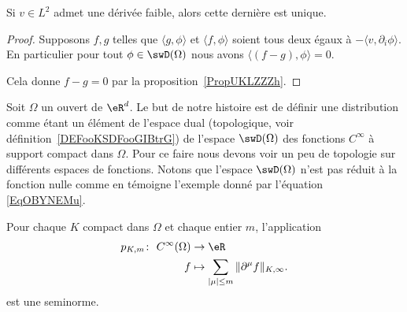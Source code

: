\begin{lemma}
	Si \( v\in L^2\) admet une dérivée faible, alors cette dernière est unique.
\end{lemma}

\begin{proof}
	Supposons \( f,g\) telles que \( \langle g, \phi\rangle \) et \( \langle f, \phi\rangle \) soient tous deux égaux à \( -\langle v, \partial_i\phi\rangle \). En particulier pour tout \( \phi\in  \swD(\Omega)\) nous avons \( \langle (f-g), \phi\rangle =0\).

	Cela donne \( f-g=0\) par la proposition~\ref{PropUKLZZZh}.
\end{proof}

Soit \( \Omega\) un ouvert de \( \eR^d\). Le but de notre histoire est de définir une distribution comme étant un élément de l'espace dual (topologique, voir définition~\ref{DEFooKSDFooGIBtrG}) de l'espace \( \swD(\Omega)\) des fonctions \( C^{\infty}\) à support compact dans \( \Omega\). Pour ce faire nous devons voir un peu de topologie sur différents espaces de fonctions. Notons que l'espace \( \swD(\Omega)\) n'est pas réduit à la fonction nulle comme en témoigne l'exemple donné par l'équation \eqref{EqOBYNEMu}.


\begin{propositionDef}     \label{PROPooVZFHooKfSpfO}
	Pour chaque \( K\) compact dans \( \Omega\) et chaque entier \( m\), l'application
	\begin{equation}  \label{EQooZSQUooAJRIFe}
		\begin{aligned}
			p_{K,m}\colon \ C^{\infty}(\Omega) & \to \eR                                                        \\
			f                                  & \mapsto  \sum_{| \mu |\leq m}\| \partial^{\mu}f \|_{K,\infty}.
		\end{aligned}
	\end{equation}
	est une seminorme.
\end{propositionDef}

